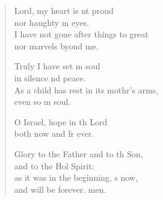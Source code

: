\begin{verse}
  \begin{patverse}
 Lord, my heart is nt proud\Med\\
nor haughty m eyes.\\
I have not gone after things to great\Med\\
nor marvels byond me.

Truly I have set m soul\Med\\
in silence nd peace.\\
As a child has rest in its mothr’s arms,\Med\\
even so m soul.

O Israel, hope in th Lord\Med\\
both now and fr ever.

Glory to the Father and to th Son,\Med\\
and to the Hol Spirit:\\
as it was in the beginning, \pointup{\i}s now,\Med\\
and will be forever. men.
  \end{patverse}
\end{verse}
